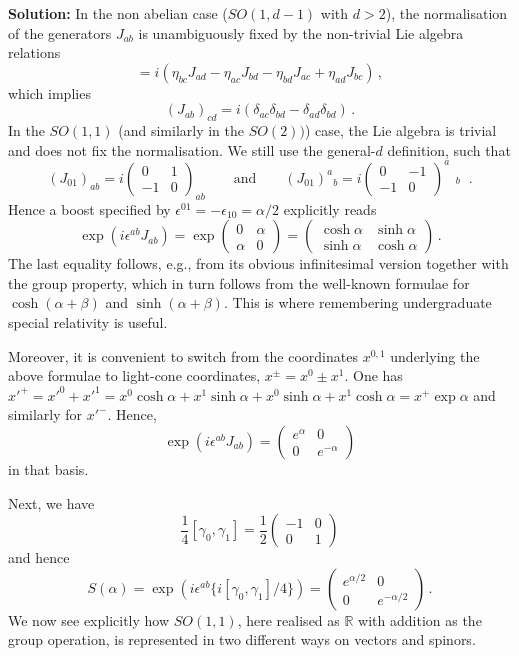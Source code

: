 \documentclass[12pt]{article}
\newcommand{\be}{\begin{equation}}
\newcommand{\ee}{\end{equation}}
\numberwithin{equation}{section}
\begin{document}
\noindent
{\bf Solution:} In the non abelian case ($SO(1,d-1)$ with $d>2$), the normalisation of the generators $J_{ab}$ is unambiguously fixed by the non-trivial Lie algebra relations
\be
[J_{ab},J_{cd}]=i(\eta_{bc}J_{ad}-\eta_{ac}J_{bd}-\eta_{bd}J_{ac}+
\eta_{ad}J_{bc})\,,
\ee
which implies
\be
(J_{ab})_{cd}=i(\delta_{ac}\delta_{bd}-\delta_{ad}\delta_{bd})\,.
\ee
In the $SO(1,1)$ (and similarly in the $SO(2))$) case, the Lie algebra is trivial and does not fix the normalisation. We still use the general-$d$ definition, such that
\be
(J_{01})_{ab}=i\left(\begin{array}{rr} 0 & 1 \\ -1 & 0 \end{array}
\right)_{ab}\qquad\mbox{and}\qquad (J_{01})^a{}_b=i\left(\begin{array}{rr} 0 & -1 \\ -1 & 0 \end{array}
\right)^a\!\!\begin{array}{c}{} \\ {}_b \end{array}\,.
\ee
Hence a boost specified by $\epsilon^{01}=-\epsilon_{10}=\alpha/2$ explicitly reads
\be
\exp(i\epsilon^{ab}J_{ab})=\exp\left(\begin{array}{rr} 0 & \alpha \\ \alpha & 0
\end{array} \right)
=\left(\begin{array}{rr} \cosh\alpha & \sinh \alpha \\ \sinh \alpha & \cosh \alpha \end{array} \right) \,.
\ee
The last equality follows, e.g., from its obvious infinitesimal version together with the group property, which in turn follows from the well-known formulae for $\cosh(\alpha+\beta)$ and $\sinh(\alpha+\beta)$. This is where remembering undergraduate special relativity is useful.

Moreover, it is convenient to switch from the coordinates $x^{0,1}$ underlying the above formulae to light-cone coordinates, $x^{\pm}=x^0\pm x^1$.
One has $x'^+=x'^0+x'^1= x^0\cosh\alpha + x^1\sinh\alpha + x^0\sinh\alpha + x^1\cosh\alpha = x^+\exp\alpha$ and similarly for $x'^-$. Hence,
\be
\exp(i\epsilon^{ab}J_{ab})=\left(\begin{array}{cc} e^\alpha & 0 \\ 0 & e^{-\alpha} \end{array} \right)
\ee
in that basis.

Next, we have
\be
\frac{1}{4}[\gamma_0,\gamma_1]=\frac{1}{2}\left(\begin{array}{rr}
-1 & 0 \\ 0 & 1 \end{array} \right)
\ee
and hence
\be
S(\alpha)=\exp(i\epsilon^{ab}\{i[\gamma_0,\gamma_1]/4\})=
\left(\begin{array}{cc} e^{\alpha/2} & 0 \\ 0 & e^{-\alpha/2} \end{array} \right)\,.
\ee
We now see explicitly how $SO(1,1)$, here realised as $\mathbb{R}$ with addition as the group operation, is represented in two different ways on vectors and spinors.
\end{document}
